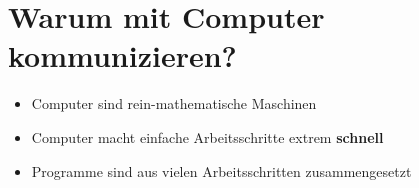 
\section{Warum mit Computer kommunizieren?}
\begin{frame}
	\slidehead
	\begin{itemize}
		\item Computer sind rein-mathematische Maschinen
		\item Computer macht einfache Arbeitsschritte extrem \textbf{schnell}
		\item Programme sind aus vielen Arbeitsschritten zusammengesetzt
	\end{itemize}
\end{frame}


